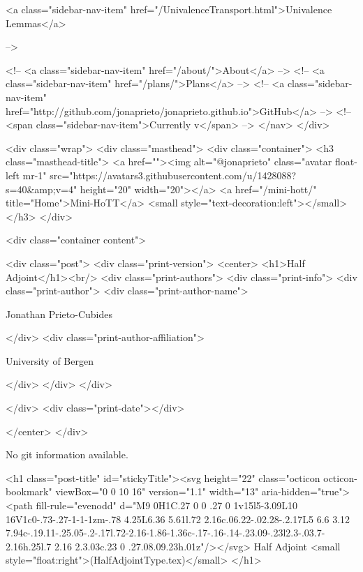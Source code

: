       
    
      
        
          <a class="sidebar-nav-item" href="/UnivalenceTransport.html">Univalence Lemmas</a>
        
      
     -->

    <!-- <a class="sidebar-nav-item" href="/about/">About</a> -->
    <!-- <a class="sidebar-nav-item" href="/plans/">Plans</a> -->
    <!-- <a class="sidebar-nav-item" href="http://github.com/jonaprieto/jonaprieto.github.io">GitHub</a> -->
    <!-- <span class="sidebar-nav-item">Currently v</span> -->
  </nav>
</div>

    <div class="wrap">
      <div class="masthead">
        <div class="container">
          <h3 class="masthead-title">
            <a href=""><img alt="@jonaprieto" class="avatar float-left mr-1" src="https://avatars3.githubusercontent.com/u/1428088?s=40&amp;v=4" height="20" width="20"></a>
            <a href="/mini-hott/" title="Home">Mini-HoTT</a>
            <small style="text-decoration:left"></small>
          </h3>
        </div>
      
      <div class="container content">
        







<div class="post">
  <div class="print-version">
    <center>
      <h1>Half Adjoint</h1><br/>
        <div class="print-authors">
          <div class="print-info">
            <div class="print-author">
              <div class="print-author-name">
                
                  Jonathan Prieto-Cubides
                
              </div>
              <div class="print-author-affiliation">
                
                  University of Bergen
                
                </div>
            </div>
          </div>
          
          
        </div>
        <div class="print-date"></div>
        
        
    </center>
  </div>

  
  No git information available.
  

  <h1 class="post-title" id="stickyTitle"><svg height="22" class="octicon octicon-bookmark" viewBox="0 0 10 16" version="1.1" width="13" aria-hidden="true"><path fill-rule="evenodd" d="M9 0H1C.27 0 0 .27 0 1v15l5-3.09L10 16V1c0-.73-.27-1-1-1zm-.78 4.25L6.36 5.61l.72 2.16c.06.22-.02.28-.2.17L5 6.6 3.12 7.94c-.19.11-.25.05-.2-.17l.72-2.16-1.86-1.36c-.17-.16-.14-.23.09-.23l2.3-.03.7-2.16h.25l.7 2.16 2.3.03c.23 0 .27.08.09.23h.01z"/></svg> Half Adjoint <small style="float:right">(HalfAdjointType.tex)</small>
  </h1>

